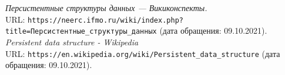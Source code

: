 \begin{thebibliography}{99}
    {\itshape Персистентные структуры данных — Викиконспекты.} \\URL: \texttt{https://neerc.ifmo.ru/wiki/index.php?title=Персистентные\_структуры\_данных} (дата обращения: 09.10.2021).
    {\itshape Persistent data structure - Wikipedia} \\URL: \texttt{https://en.wikipedia.org/wiki/Persistent\_data\_structure} (дата обращения: 09.10.2021).
    \end{thebibliography}
    \pagebreak